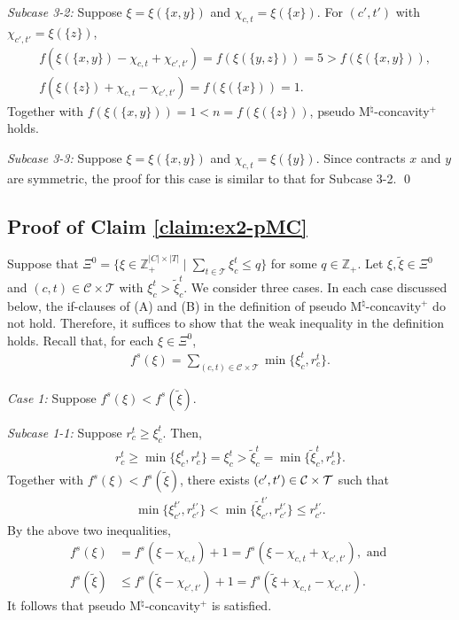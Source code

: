 \documentclass[12pt]{amsart}
\newcommand{\corigin}{c'}
\theoremstyle{remark}
\begin{document}
\smallskip
\noindent
\emph{Subcase 3-2:}
Suppose $\xi=\xi(\{x,y\})$ and $\chi_{c,t}=\xi(\{x\})$. For $(c',t')$ with $\chi_{c',t'}=\xi(\{z\})$,
\begin{align*}
&f(\xi(\{x,y\})-\chi_{c,t}+\chi_{c',t'})=f(\xi(\{y,z\}))=5>f(\xi(\{x,y\})),   \\
&f(\xi(\{z\})+\chi_{c,t}-\chi_{c',t'})=f(\xi(\{x\}))=1.
\end{align*}
Together with $f(\xi(\{x,y\}))=1<n=f(\xi(\{z\}))$, pseudo M$^\natural$-concavity$^+$ holds.

\smallskip
\noindent
\emph{Subcase 3-3:}
Suppose $\xi=\xi(\{x,y\})$ and $\chi_{c,t}=\xi(\{y\})$. Since contracts $x$ and $y$ are symmetric, the proof for this case is similar to that for Subcase 3-2.
\qed


\bigskip




\subsection*{Proof of Claim \ref{claim:ex2-pMC}}
Suppose that $\Xi^0=\{\xi\in \mathbb{Z}^{|C|\times |T|}_+ \mid \sum_{t \in \mathcal{T}}\xi_c^t\leq q\}$ for some $q\in \mathbb{Z}_+$.
Let $\xi, \tilde{\xi} \in \Xi^0$ and $(c, t) \in \mathcal{C} \times \mathcal{T}$ with $\xi_c^t>\tilde{\xi}_{c}^t$.
We consider three cases. In each case discussed below, the if-clauses of (A) and (B) in the definition of pseudo M$^\natural$-concavity$^+$ do not hold. Therefore, it suffices to show that the weak inequality in the definition holds. Recall that, for each $\xi \in \Xi^0$,
\begin{align*}
f^s(\xi)=\sum_{(c,t) \in \mathcal{C}\times \mathcal{T}} \min\{ \xi^t_c, r^t_c\}.
\end{align*}

\smallskip
\noindent
\emph{Case 1:}
Suppose $f^s(\xi)<f^s(\tilde \xi)$.

\smallskip
\noindent
\emph{Subcase 1-1:}
Suppose $r_c^t\geq \xi_c^t$. Then,
\begin{align*}
r_c^t\geq \min\{ \xi_c^t, r_c^t\}=\xi_c^t>\tilde \xi_c^t=\min\{ \tilde \xi_c^t, r_c^t\}.
\end{align*}
Together with $f^s(\xi)<f^s(\tilde \xi)$, there exists $(\corigin, t')\in \calc\times \calt$ such that
\begin{align*}
\min\{ \xi_{\corigin}^{t'}, r_{\corigin}^{t'}\}<\min\{ \tilde \xi_{\corigin}^{t'}, r_{\corigin}^{t'}\}\leq r_{\corigin}^{t'}.
\end{align*}
By the above two inequalities,
\begin{align*}
f^s(\xi)&=f^s(\xi-\chi_{c,t})+1=f^s(\xi-\chi_{c,t}+\chi_{\corigin,t'}), \text{ and } \\
f^s(\tilde \xi)&\leq f^s(\tilde \xi-\chi_{\corigin, t'})+1=f^s(\tilde \xi+\chi_{c, t}-\chi_{\corigin, t'}).
\end{align*}
It follows that pseudo M$^\natural$-concavity$^+$ is satisfied.
\end{document}
